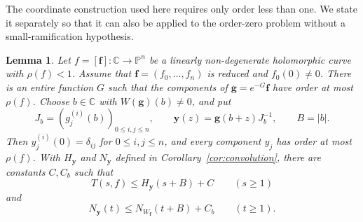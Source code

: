 \documentclass[11pt,letterpaper,reqno]{amsart}
\newtheorem{lem}[thm]{Lemma}
\theoremstyle{remark}
\numberwithin{equation}{section}
\newcommand{\C}{\mathbb C}
\newcommand{\PP}{\mathbb P}
\newcommand{\fv}{\bm f}
\newcommand{\gv}{\bm g}
\newcommand{\yv}{\bm y}
\begin{document}
The coordinate construction used here requires only order less than one.
We state it separately so that it can also be applied to the order-zero
problem without a small-ramification hypothesis.

\begin{lem}\label{lem:small-order-coordinates}
Let $f=[\fv]\colon\C\to\PP^n$ be a linearly non-degenerate
holomorphic curve with $\rho(f)<1$. Assume that
$\fv=(f_0,\ldots,f_n)$ is reduced and $f_0(0)\ne0$. There is an entire function $G$
such that the components of $\gv=e^{-G}\fv$ have order at most $\rho(f)$.
Choose $b\in\C$ with $W(\gv)(b)\ne0$, and put
\[
 J_b=(g_j^{(i)}(b))_{0\leq i,j\leq n},\qquad
 \yv(z)=\gv(b+z)J_b^{-1},\qquad B=|b|.
\]
Then $y_j^{(i)}(0)=\delta_{ij}$ for $0\leq i,j\leq n$, and every
component $y_j$ has order at most $\rho(f)$. With $H_{\yv}$ and
$N_{\yv}$ defined in Corollary~\ref{cor:convolution}, there are constants
$C,C_b$ such that
\begin{equation}\label{eq:small-order-T}
 T(s,f)\leq H_{\yv}(s+B)+C\qquad(s\geq1)
\end{equation}
and
\begin{equation}\label{eq:translated-count}
 N_{\yv}(t)\leq N_{W_{\fv}}(t+B)+C_b\qquad(t\geq1).
\end{equation}
\end{lem}
\end{document}
